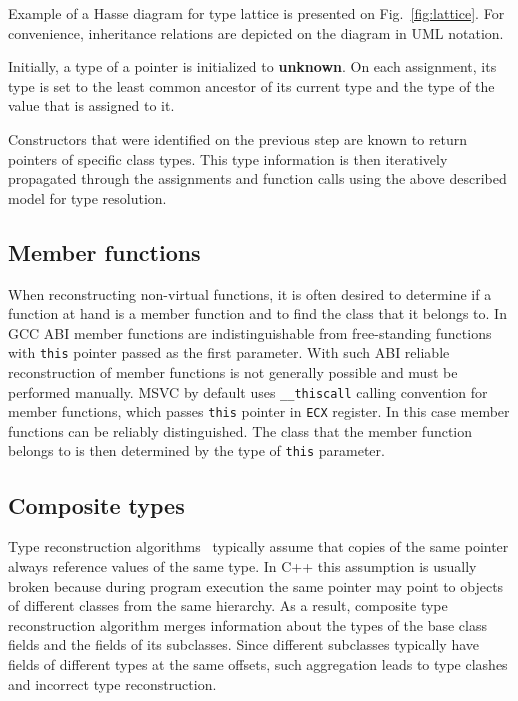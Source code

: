 \documentclass[10pt, conference, compsocconf]{IEEEtran}
\newcommand{\skipsectionspace}{}
\begin{document}
Example of a Hasse diagram for type lattice is presented on Fig.~\ref{fig:lattice}. 
For convenience, inheritance relations are depicted on the diagram in UML notation.

Initially, a type of a pointer is initialized to \textbf{unknown}. 
On each assignment, its type is set to the least common ancestor of its 
current type and the type of the value that is assigned to it.

Constructors that were identified on the previous step are known to return pointers
of specific class types. 
This type information is then iteratively propagated through the assignments and function 
calls using the above described model for type resolution.



\subsection{Member functions}\skipsectionspace
When reconstructing non-virtual functions, it is often desired to determine if a 
function at hand is a member function and to find the class that it belongs to.
In GCC ABI member functions are indistinguishable from free-standing functions with 
\lstinline{this} pointer passed as the first parameter. 
With such ABI reliable reconstruction of member functions is not generally 
possible and must be performed manually. 
MSVC by default uses \lstinline{__thiscall} calling convention for 
member functions, which passes \lstinline{this} pointer in \verb|ECX| register. 
In this case member functions can be reliably distinguished.
The class that the member function belongs to is then determined by the
type of \lstinline{this} parameter.



\subsection{Composite types}\skipsectionspace
Type reconstruction algorithms~\cite{mycroft1999,wcre2008} typically assume 
that copies of the same pointer always reference values of the same type.
In C++ this assumption is usually broken because during program execution the same pointer 
may point to objects of different classes from the same hierarchy.
As a result, composite type reconstruction algorithm \cite{scam2010} merges information 
about the types of the base class fields and the fields of its subclasses.
Since different subclasses typically have fields of different types at the 
same offsets, such aggregation leads to type clashes and incorrect type reconstruction.
\end{document}
